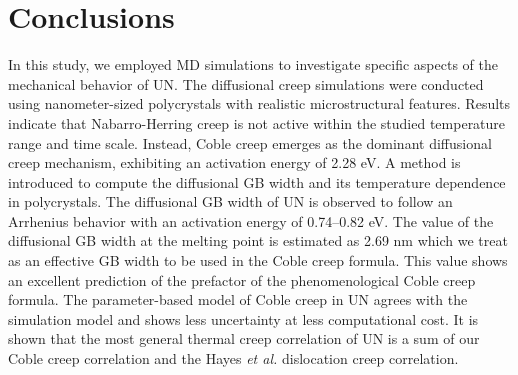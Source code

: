 \documentclass[preprint, 12pt]{elsarticle}
\newcommand{\?}{\stackrel{?}{=}}
\begin{document}

\FloatBarrier

\section{Conclusions}

In this study, we employed MD simulations to investigate specific aspects of the mechanical behavior of UN. The diffusional creep simulations were conducted using nanometer-sized polycrystals with realistic microstructural features. Results indicate that Nabarro-Herring creep is not active within the studied temperature range and time scale. Instead, Coble creep emerges as the dominant diffusional creep mechanism, exhibiting an activation energy of 2.28 eV. A method is introduced to compute the diffusional GB width and its temperature dependence in polycrystals. The diffusional GB width of UN is observed to follow an Arrhenius behavior with an activation energy of 0.74--0.82 eV. The value of the diffusional GB width at the melting point is estimated as 2.69 nm which we treat as an effective GB width to be used in the Coble creep formula. This value shows an excellent prediction of the prefactor of the phenomenological Coble creep formula. The parameter-based model of Coble creep in UN agrees with the simulation model and shows less uncertainty at less computational cost. It is shown that the most general thermal creep correlation of UN is a sum of our Coble creep correlation and the Hayes \textit{et al.} dislocation creep correlation.
\end{document}
